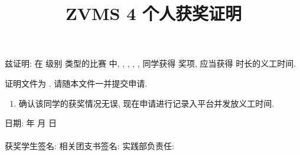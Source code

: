 \documentclass{article}
\title{ZVMS 4 个人获奖证明}
\date{}
\begin{document}
\maketitle

兹证明: 在 \underline{\hspace{3em}} 级别 \underline{\hspace{3em}} 类型的比赛 \underline{\hspace{8em}} 中, \underline{\hspace{3em}}, \underline{\hspace{3em}}, \underline{\hspace{3em}}, \underline{\hspace{3em}}, \underline{\hspace{3em}} 同学获得 \underline{\hspace{3em}} 奖项, 应当获得 \underline{\hspace{3em}} 时长的义工时间.

证明文件为 \underline{\hspace{5em}}. 请随本文件一并提交申请.

\begin{enumerate}[label=$\square$]
  \item 确认该同学的获奖情况无误, 现在申请进行记录入平台并发放义工时间.
\end{enumerate}

\begin{flushright}
  日期: \underline{\hspace{4em}} 年 \underline{\hspace{2em}} 月 \underline{\hspace{2em}} 日
  ~\\~\\
  获奖学生签名: \underline{\hspace{6em}} \hspace{1em}
  相关团支书签名: \underline{\hspace{6em}} \hspace{1em}
  实践部负责任: \underline{\hspace{6em}}
\end{flushright}
\end{document}
